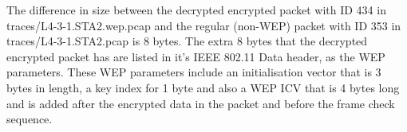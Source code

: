 The difference in size between the decrypted encrypted packet with ID 434 in traces/L4-3-1.STA2.wep.pcap and the regular (non-WEP) packet with ID 353 in traces/L4-3-1.STA2.pcap is 8 bytes.
The extra 8 bytes that the decrypted encrypted packet has are listed in it's IEEE 802.11 Data header, as the WEP parameters. These WEP parameters include an initialisation vector
that is 3 bytes in length, a key index for 1 byte and also a WEP ICV that is 4 bytes long and is added after the encrypted data in the packet and before the frame check sequence.
